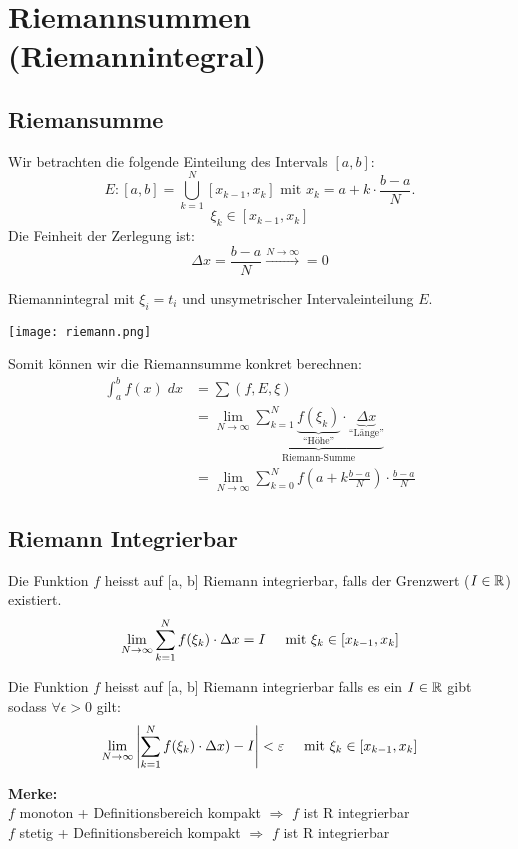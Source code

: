 \section{Riemannsummen (Riemannintegral)}
\subsection{Riemansumme}
Wir betrachten die folgende Einteilung des Intervals $[a,b]$:\[
E: [a,b] = \bigcup_{k=1}^{N}[x_{k-1}, x_k] \text{ mit } x_k = a + k \cdot \frac{b-a}{N}.
\]
\[
	\xi_k \in [x_{k-1}, x_k]
\]
Die Feinheit der Zerlegung ist:
\[
\Delta x = \frac{b-a}{N} \xrightarrow{N \to \infty} = 0
\]


\begin{minipage}{0.4\columnwidth}
	Riemannintegral mit $\xi_i = t_i$ und unsymetrischer Intervaleinteilung $E$.
\end{minipage}
\begin{minipage}{0.60\columnwidth}
	\texttt{[image: riemann.png]}
\end{minipage}

Somit können wir die Riemannsumme konkret berechnen:
\begin{align*}
\int_a^b f(x)\;dx &=\sum (f,E,\xi)\\
&= \lim_{N \to \infty} \underbrace{\sum_{k=1}^{N}
	\underbrace{f(\xi_k)}_{\text{``Höhe''}} \cdot \underbrace{\Delta x}_{\text{``Länge''}}}_{\text{Riemann-Summe}}\\
&= \lim_{N \to \infty} \sum_{k=0}^{N} {f(a + k\frac{b-a}{N})} \cdot \frac{b-a}{N}
\end{align*}


\subsection{Riemann Integrierbar}
\begin{definition}  Die Funktion $f$ heisst auf [a, b] Riemann integrierbar, falls der Grenzwert ($I \in \R$) existiert.
\[
	\lim_{N \to \infty} \sum_{k = 1}^N f(\xi_k) \cdot \Delta x = I \hspace{0.5cm} \text{mit } \xi_k \in [x_{k-1}, x_k]
\]
\end{definition}

\begin{definition} 
Die Funktion $f$ heisst auf [a, b] Riemann integrierbar falls es ein $I \in \R$ gibt sodass $\forall \epsilon > 0$ gilt:
\[
	\lim_{N \to \infty} \left| \sum_{k = 1}^N f(\xi_k) \cdot \Delta x) - I \right| < \epsilon \hspace{0.5cm} \text{mit } \xi_k \in [x_{k-1}, x_k]
\]
\end{definition}
\textbf{Merke:}\\
$f$ monoton + Definitionsbereich kompakt $\Rightarrow$ $f$ ist R integrierbar\\
$f$ stetig + Definitionsbereich kompakt $\Rightarrow$ $f$ ist R integrierbar

